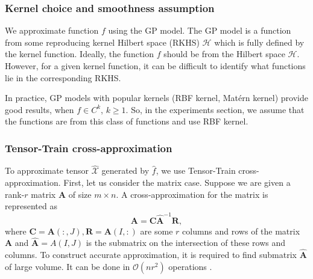 
\subsubsection{Kernel choice and smoothness assumption}
We approximate function $f$ using the GP model.
The GP model is a function from some reproducing kernel Hilbert space (RKHS) $\mathcal{H}$ which is fully defined by the kernel function.
Ideally, the function $f$ should be from the Hilbert space $\mathcal{H}$.
However, for a given kernel function, it can be difficult to identify what functions lie in the corresponding RKHS.

In practice, GP models with popular kernels (RBF kernel, Mat{\'{e}}rn kernel) provide good results, when $f \in C^k$, $k \ge 1$.
So, in the experiments section, we assume that the functions are from this class of functions and use RBF kernel.

\subsubsection{Tensor-Train cross-approximation}
\label{sec:tt_cross}
To approximate tensor $\widehat{\mathcal{X}}$ generated by $\hat{f}$, we use Tensor-Train cross-approximation.
First, let us consider the matrix case.
Suppose we are given a rank-$r$ matrix $\mathbf{A}$ of size $m \times n$.
A cross-approxi\-mation for the matrix is represented as
\[
    \mathbf{A} = \mathbf{C} \widehat{\mathbf{A}}^{-1} \mathbf{R},
\]
where $\mathbf{C} = \mathbf{A}(:, J), \mathbf{R} = \mathbf{A}(I, :)$ are some $r$ columns and rows of the matrix $\mathbf{A}$ and $\widehat{\mathbf{A}} = A(I, J)$ is the submatrix on the intersection of these rows and columns. To construct accurate approximation, it is required to find submatrix $\widehat{\mathbf{A}}$ of large volume.
It can be done in $\mathcal{O}(nr^2)$ operations \citep{tyrtyshnikov2000incomplete}.


